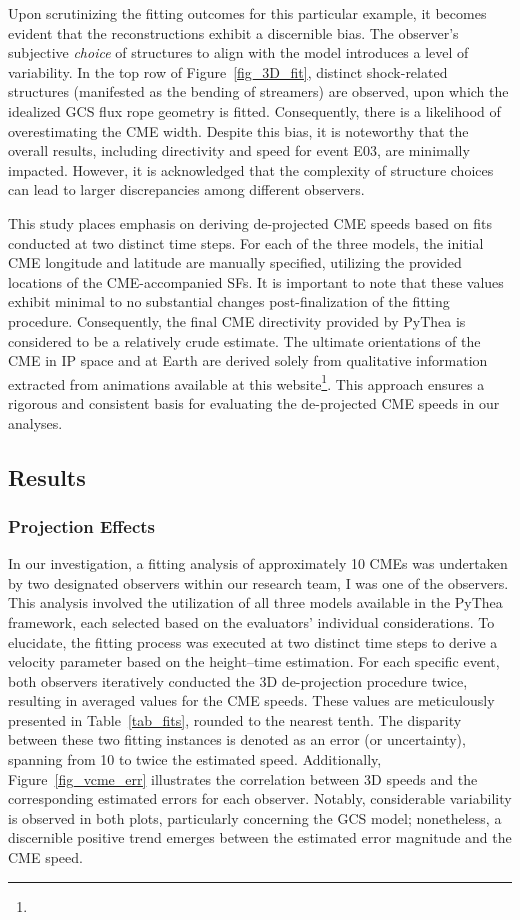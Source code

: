Upon scrutinizing the fitting outcomes for this particular example, it becomes evident that the reconstructions exhibit a discernible bias. The observer's subjective \textit{choice} of structures to align with the model introduces a level of variability. In the top row of Figure~\ref{fig_3D_fit}, distinct shock-related structures (manifested as the bending of streamers) are observed, upon which the idealized GCS flux rope geometry is fitted. Consequently, there is a likelihood of overestimating the CME width. Despite this bias, it is noteworthy that the overall results, including directivity and speed for event E03, are minimally impacted. However, it is acknowledged that the complexity of structure choices can lead to larger discrepancies among different observers.

This study places emphasis on deriving de-projected CME speeds based on fits conducted at two distinct time steps. For each of the three models, the initial CME longitude and latitude are manually specified, utilizing the provided locations of the CME-accompanied SFs. It is important to note that these values exhibit minimal to no substantial changes post-finalization of the fitting procedure. Consequently, the final CME directivity provided by PyThea is considered to be a relatively crude estimate. The ultimate orientations of the CME in IP space and at Earth are derived solely from qualitative information extracted from animations available at this website\footnote{\helioweatherurl}. This approach ensures a rigorous and consistent basis for evaluating the de-projected CME speeds in our analyses.

\subsection{Results}
\subsubsection{Projection Effects}
In our investigation, a fitting analysis of approximately 10 CMEs was undertaken by two designated observers within our research team, I was one of the observers. This analysis involved the utilization of all three models available in the PyThea framework, each selected based on the evaluators' individual considerations.
To elucidate, the fitting process was executed at two distinct time steps to derive a velocity parameter based on the height–time estimation. For each specific event, both observers iteratively conducted the 3D de-projection procedure twice, resulting in averaged values for the CME speeds. These values are meticulously presented in Table~\ref{tab_fits}, rounded to the nearest tenth. The disparity between these two fitting instances is denoted as an error (or uncertainty), spanning from 10 \kms to twice the estimated speed. Additionally, Figure~\ref{fig_vcme_err} illustrates the correlation between 3D speeds and the corresponding estimated errors for each observer. Notably, considerable variability is observed in both plots, particularly concerning the GCS model; nonetheless, a discernible positive trend emerges between the estimated error magnitude and the CME speed.

